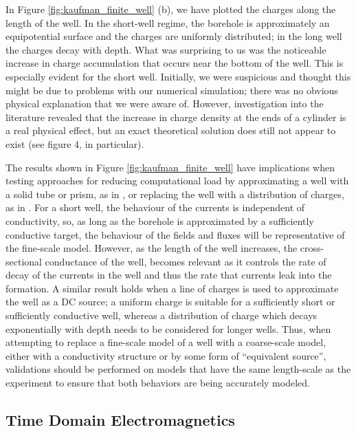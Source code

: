 \documentclass[preprint,review,3p,times,onecolumn,authoryear]{elsarticle}
\begin{document}
In Figure \ref{fig:kaufman_finite_well} (b), we have plotted the charges along the length of the well. In the short-well regime, the borehole is approximately an equipotential surface and the charges are uniformly distributed; in the long well the charges decay with depth. What was surprising to us was the noticeable increase in charge accumulation that occurs near the bottom of the well. This is especially evident for the short well. Initially, we were suspicious and thought this might be due to problems with our numerical simulation; there was no obvious physical explanation that we were aware of. However, investigation into the literature revealed that the increase in charge density at the ends of a cylinder is a real physical effect, but an exact theoretical solution does still not appear to exist \citep{Griffiths1997} (see figure 4, in particular).

The results shown in Figure \ref{fig:kaufman_finite_well} have implications when testing approaches for reducing computational load by approximating a well with a solid tube or prism, as in \cite{Um2015}, or replacing the well with a distribution of charges, as in \cite{Weiss2016}. For a short well, the behaviour of the currents is independent of conductivity, so, as long as the borehole is approximated by a sufficiently conductive target, the behaviour of the fields and fluxes will be representative of the fine-scale model. However, as the length of the well increases, the cross-sectional conductance of the well, becomes relevant as it controls the rate of decay of the currents in the well and thus the rate that currents leak into the formation. A similar result holds when a line of charges is used to approximate the well as a DC source; a uniform charge is suitable for a sufficiently short or sufficiently conductive well, whereas a distribution of charge which decays exponentially with depth needs to be considered for longer wells. Thus, when attempting to replace a fine-scale model of a well with a coarse-scale model, either with a conductivity structure or by some form of ``equivalent source'', validations should be performed on models that have the same length-scale as the experiment to ensure that both behaviors are being accurately modeled.



\subsection{Time Domain Electromagnetics}
\label{sec:TDEM}
\end{document}

